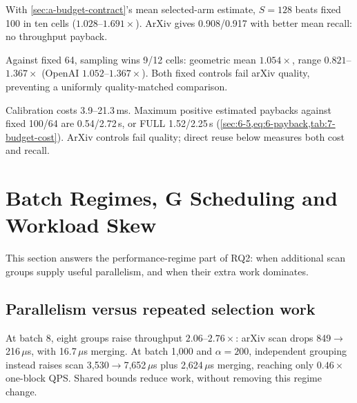 With \cref{sec:a-budget-contract}'s mean selected-arm estimate, $S=128$ beats fixed 100 in ten cells ($1.028$--$1.691\times$). ArXiv gives 0.908/0.917 with better mean recall: no throughput payback.

Against fixed 64, sampling wins 9/12 cells: geometric mean $1.054\times$, range $0.821$--$1.367\times$ (OpenAI $1.052$--$1.367\times$). Both fixed controls fail arXiv quality, preventing a uniformly quality-matched comparison.

\begin{table}[tbp]
\centering
\caption[Sampled-calibration economics]{Calibration economics, $S=128$. Rates are kQPS and rule rate is
mean selected-arm QPS. Ratios compare with fixed 100 and fixed 64.
The ``Batches'' column gives payback relative to fixed 100 using 500
queries, or 499 for Stella; ``Never'' denotes no throughput payback.
The quality column separately marks whether fixed 100 meets the
held-out loss target.}
\label{tab:7-budget-cost}
\footnotesize\setlength{\tabcolsep}{3pt}

\end{table}

Calibration costs 3.9--21.3\,ms. Maximum positive estimated paybacks against fixed 100/64 are 0.54/2.72\,s, or FULL 1.52/2.25\,s (\cref{sec:6-5,eq:6-payback,tab:7-budget-cost}). ArXiv controls fail quality; direct reuse below measures both cost and recall.



\section{Batch Regimes, G Scheduling and Workload Skew}
\label{sec:7-6}

This section answers the performance-regime part of RQ2: when additional
scan groups supply useful parallelism, and when their extra work dominates.

\subsection{Parallelism versus repeated selection work}



At batch 8, eight groups raise throughput $2.06$--$2.76\times$: arXiv scan drops 849$\to$216\,$\mu$s, with 16.7\,$\mu$s merging. At batch 1,000 and $\alpha=200$, independent grouping instead raises scan 3,530$\to$7,652\,$\mu$s plus 2,624\,$\mu$s merging, reaching only $0.46\times$ one-block QPS. Shared bounds reduce work, without removing this regime change.

